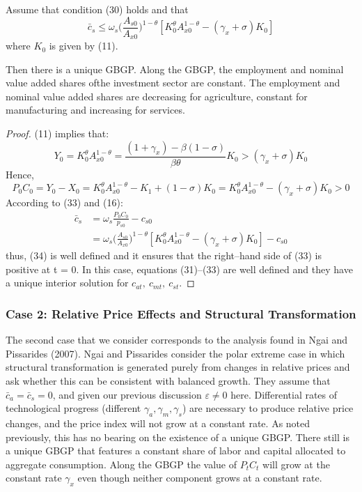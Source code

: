 \documentclass{article}
\begin{document}
    \begin{pro}
        Assume that condition (30) holds and that
        \begin{equation}
            \bar{c}_s \leq \omega_s \biggl( \frac{A_{s0}}{A_{x0}} \biggr)^{1-\theta} [K_0^\theta A_{x0}^{1-\theta} - (\gamma_x+\sigma)K_0] 
        \end{equation}
        where $K_0$ is given by (11).

        Then there is a unique GBGP. Along the GBGP, the employment and nominal value added shares ofthe investment sector are constant. The employment and nominal value added shares are decreasing for agriculture, constant for manufacturing and increasing for services.
    \end{pro}
    \begin{proof}
        (11) implies that:
        \begin{equation*}
            Y_0=K_0^\theta A_{x0}^{1-\theta}=\frac{(1+\gamma_x)-\beta(1-\sigma)}{\beta \theta} K_0>(\gamma_x+\sigma)K_0
        \end{equation*}
        Hence,
        \begin{equation*}
            P_0C_0=Y_0-X_0=K_0^\theta A_{x0}^{1-\theta}-K_1+(1-\sigma)K_0=K_0^\theta A_{x0}^{1-\theta}-(\gamma_x+\sigma)K_0>0
        \end{equation*}
        According to (33) and (16):
        \begin{align*}
            \bar{c}_s&=\omega_s\frac{P_0C_0}{p_{s0}} - c_{s0}\\
            &=\omega_s \biggl( \frac{A_{s0}}{A_{x0}} \biggr)^{1-\theta} [K_0^\theta A_{x0}^{1-\theta} - (\gamma_x+\sigma)K_0] - c_{s0}
        \end{align*}
        thus, (34) is well defined and it ensures that the right–hand side of (33) is positive at t = 0. In this case, equations (31)–(33) are well defined and they have a unique interior solution for $c_{at},\ c_{mt},\ c_{st}$.
    \end{proof}

    \subsubsection{Case 2: Relative Price Effects and Structural Transformation}
    The second case that we consider corresponds to the analysis found in Ngai and Pissarides (2007). Ngai and Pissarides consider the polar extreme case in which structural transformation is generated purely from changes in relative prices and ask whether this can be consistent with balanced growth. They assume that $\bar{c}_a=\bar{c}_s=0$, and given our previous discussion $\varepsilon \neq 0$ here. Differential rates of technological progress (different $\gamma_a,\gamma_m,\gamma_s$) are necessary to produce relative price changes, and the price index will not grow at a constant rate. As noted previously, this has no bearing on the existence of a unique GBGP. There still is a unique GBGP that features a constant share of labor and capital allocated to aggregate consumption. Along the GBGP the value of $P_tC_t$ will grow at the constant rate $\gamma_x$ even though neither component grows at a constant rate.
\end{document}
